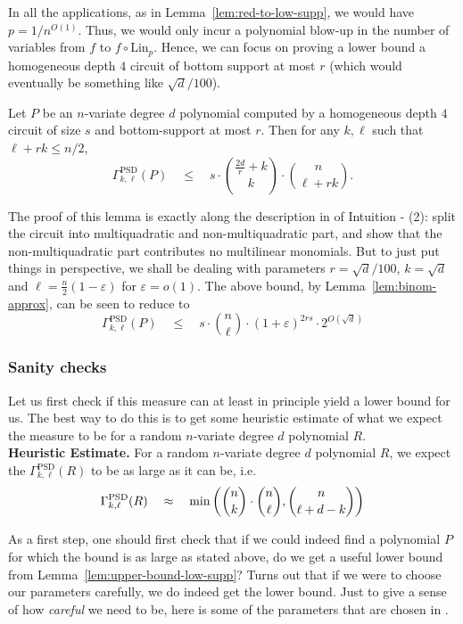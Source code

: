 \documentclass[12pt]{report}
\renewcommand{\epsilon}{\varepsilon}
\begin{document}
In all the applications, as in Lemma~\ref{lem:red-to-low-supp}, we would have $p = 1/n^{O(1)}$. Thus, we would only incur a polynomial blow-up in the number of variables from $f$ to $f\circ \mathrm{Lin}_p$. Hence, we can focus on proving a lower bound  a homogeneous depth $4$ circuit of bottom support at most $r$ (which would eventually be something like $\sqrt{d}/100$). 

\begin{lemma}\label{lem:upper-bound-low-supp}
Let $P$ be an $n$-variate degree $d$ polynomial computed by a homogeneous depth $4$ circuit of size $s$ and bottom-support at most $r$. Then for any $k,\ell$ such that $\ell + rk \leq n/2$, 
\[
\Gamma^{\mathrm{PSD}}_{k,\ell}(P) \quad \leq \quad s \cdot \binom{\frac{2d}{r}+k}{k}\cdot \binom{n}{\ell+rk}. 
\]
\end{lemma}

The proof of this lemma is exactly along the description in of Intuition - (2): split the circuit into multiquadratic and non-multiquadratic part, and show that the non-multiquadratic part contributes no multilinear monomials. But to just put things in perspective, we shall be dealing with parameters $r = \sqrt{d}/100$, $k = \sqrt{d}$ and $\ell = \frac{n}{2}(1 - \epsilon)$ for $\epsilon = o(1)$. The above bound, by Lemma~\ref{lem:binom-approx}, can be seen to reduce to
\[
\Gamma^{\mathrm{PSD}}_{k,\ell}(P) \quad \leq \quad s \cdot \binom{n}{\ell} \cdot (1+\epsilon)^{2rs} \cdot 2^{O(\sqrt{d})}
\]


\subsubsection*{Sanity checks}

Let us first check if this measure can at least in principle yield a lower bound for us. The best way to do this is to get some heuristic estimate of what we expect the measure to be for a random $n$-variate degree $d$ polynomial $R$. \\

{\bf Heuristic Estimate. } For a random $n$-variate degree $d$ polynomial $R$, we expect the $\Gamma^{\mathrm{PSD}}_{k,\ell}(R)$ to be as large as it can be, i.e.
\[
\Gamma^{\mathrm{PSD}}_{k,\ell}(R) \quad \approx \quad \min\left(\binom{n}{k}\cdot \binom{n}{\ell}, \binom{n}{\ell + d-k}\right)
\]

As a first step, one should first check that if we could indeed find a polynomial $P$ for which the bound is as large as stated above, do we get a useful lower bound from Lemma~\ref{lem:upper-bound-low-supp}? Turns out that if we were to choose our parameters carefully, we do indeed get the lower bound. Just to give a sense of how \emph{careful} we need to be, here is some of the parameters that are chosen in \cite{KLSS,KS14}. 
\end{document}
